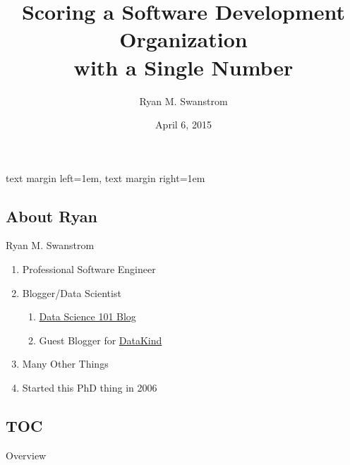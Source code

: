 \usepackage[english] {babel}
\usepackage[T1]      {fontenc}
\usepackage{hyperref}

\usepackage{amsmath, amsfonts, graphicx}
\usepackage{tikz}
\usepackage{csquotes}
\usepackage{longtable}
\usepackage{colortbl}%
  \newcommand{\myrowcolour}{\rowcolor[gray]{0.925}}


\setbeamersize
  {text margin left=1em, text margin right=1em}

\title
  [Scoring an SDO]
  {Scoring a Software Development Organization\\ with a Single Number}

\author
  {Ryan M. Swanstrom}

\date
  {April 6, 2015}




\maketitle

\subsection{About Ryan}
\begin{frame}
  {Ryan M. Swanstrom}
  
  \begin{enumerate}
    \item Professional Software Engineer
    \item Blogger/Data Scientist
    \begin{enumerate}
        \item \href{http://101.datascience.community}{Data Science 101 Blog}
        \item Guest Blogger for \href{http://www.datakind.org/blog/}{DataKind}
    \end{enumerate}
    \item Many Other Things
    \item Started this PhD thing in 2006
  \end{enumerate}
\end{frame}


\subsection{TOC}
\begin{frame}{Overview}

  \tableofcontents

\end{frame}


